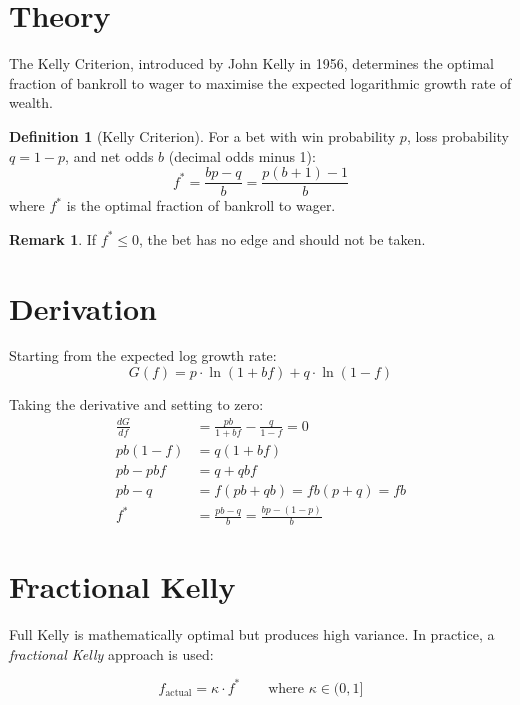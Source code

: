 \documentclass[12pt,a4paper]{report}
\theoremstyle{definition}
\newtheorem{definition}{Definition}[chapter]
\newtheorem{remark}{Remark}[chapter]
\begin{document}
\section{Theory}

The Kelly Criterion, introduced by John Kelly in 1956, determines the optimal fraction of bankroll to wager to maximise the expected logarithmic growth rate of wealth.

\begin{definition}[Kelly Criterion]
For a bet with win probability $p$, loss probability $q = 1 - p$, and net odds $b$ (decimal odds minus 1):
\begin{equation}
    f^* = \frac{bp - q}{b} = \frac{p(b+1) - 1}{b}
    \label{eq:kelly}
\end{equation}
where $f^*$ is the optimal fraction of bankroll to wager.
\end{definition}

\begin{remark}
If $f^* \leq 0$, the bet has no edge and should not be taken.
\end{remark}

\section{Derivation}

Starting from the expected log growth rate:
\begin{equation}
    G(f) = p \cdot \ln(1 + bf) + q \cdot \ln(1 - f)
\end{equation}

Taking the derivative and setting to zero:
\begin{align}
    \frac{dG}{df} &= \frac{pb}{1 + bf} - \frac{q}{1 - f} = 0 \\
    pb(1 - f) &= q(1 + bf) \\
    pb - pbf &= q + qbf \\
    pb - q &= f(pb + qb) = fb(p + q) = fb \\
    f^* &= \frac{pb - q}{b} = \frac{bp - (1-p)}{b}
\end{align}

\section{Fractional Kelly}

Full Kelly is mathematically optimal but produces high variance. In practice, a \emph{fractional Kelly} approach is used:

\begin{equation}
    f_{\text{actual}} = \kappa \cdot f^* \qquad \text{where } \kappa \in (0, 1]
\end{equation}
\end{document}
